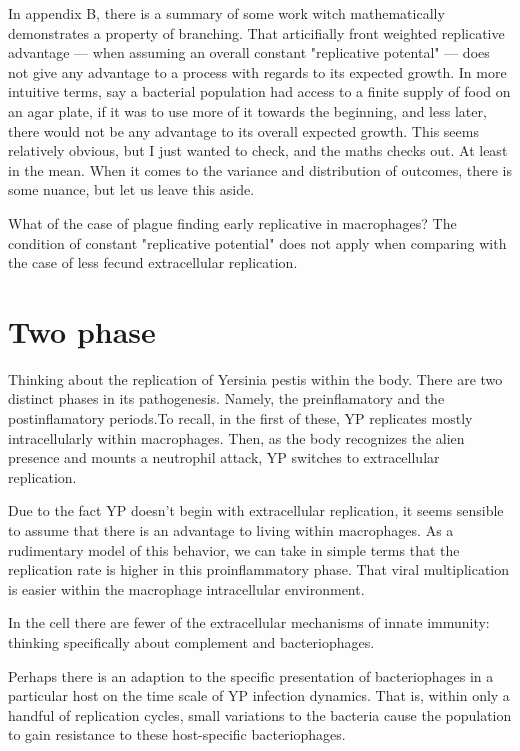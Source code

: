 In appendix B, there is a summary of some work witch mathematically demonstrates a property of branching. That articifially front weighted replicative advantage --- when assuming an overall constant "replicative potental" --- does not give any advantage to a process with regards to its expected growth. In more intuitive terms, say a bacterial population had access to a finite supply of food on an agar plate, if it was to use more of it towards the beginning, and less later, there would not be any advantage to its overall expected growth. This seems relatively obvious, but I just wanted to check, and the maths checks out. At least in the mean. When it comes to the variance and distribution of outcomes, there is some nuance,  but let us leave this aside. \par 

What of the case of plague finding early replicative in macrophages? The condition of constant "replicative potential" does not apply when comparing with the case of less fecund extracellular replication. 




\section{Two phase}



Thinking about the replication of Yersinia pestis within the body. There are two distinct phases in its pathogenesis. Namely, the preinflamatory and the postinflamatory periods.To recall,  in the first of these, YP replicates mostly intracellularly within macrophages. Then, as the body recognizes the alien presence and mounts a neutrophil attack, YP switches to extracellular replication. 

Due to the fact YP doesn't begin with extracellular replication, it seems sensible to assume that there is an advantage to living within macrophages. As a rudimentary model of this behavior, we can take in simple terms that the replication rate is higher in this proinflammatory phase. That viral multiplication is easier within the macrophage intracellular environment. 

In the cell there are fewer of the extracellular mechanisms of innate immunity: thinking specifically about complement and bacteriophages. 

Perhaps there is an adaption to the specific presentation of bacteriophages in a particular host on the time scale of YP infection dynamics. That is, within only a handful of replication cycles, small variations to the bacteria cause the population to gain resistance to these host-specific bacteriophages. 

